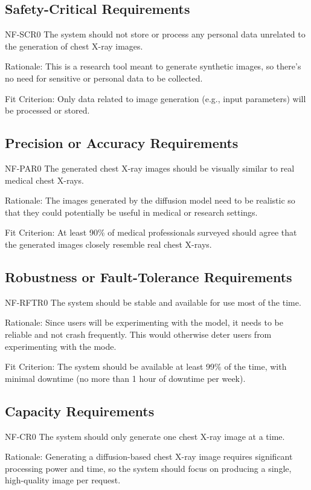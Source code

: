 \documentclass[12pt]{article}
\begin{document}
\subsection{Safety-Critical Requirements}
NF-SCR0 The system should not store or process any personal data unrelated to the generation of 
chest X-ray images.

Rationale: This is a research tool meant to generate synthetic images, so there’s no need for 
sensitive or personal data to be collected.

Fit Criterion: Only data related to image generation (e.g., input parameters) will be processed or 
stored.

\subsection{Precision or Accuracy Requirements}
NF-PAR0 The generated chest X-ray images should be visually similar to real medical chest X-rays.

Rationale: The images generated by the diffusion model need to be realistic so that they could 
potentially be useful in medical or research settings.

Fit Criterion: At least 90\% of medical professionals surveyed should agree that the generated 
images closely resemble real chest X-rays.

\subsection{Robustness or Fault-Tolerance Requirements}
NF-RFTR0 The system should be stable and available for use most of the time.

Rationale: Since users will be experimenting with the model, it needs to be reliable and not crash 
frequently. This would otherwise deter users from experimenting with the mode.

Fit Criterion: The system should be available at least 99\% of the time, with minimal downtime (no 
more than 1 hour of downtime per week).


\subsection{Capacity Requirements}
NF-CR0 The system should only generate one chest X-ray image at a time.

Rationale: Generating a diffusion-based chest X-ray image requires significant processing power 
and time, so the system should focus on producing a single, high-quality image per request.
\end{document}
